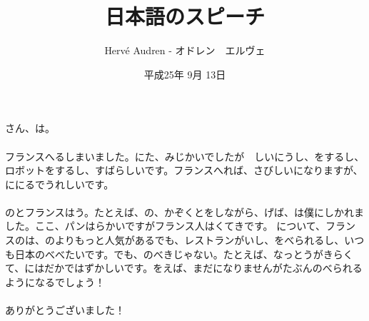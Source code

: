 \documentclass[a4paper,12pt]{article}
\begin{document}
\begin{CJK}{UTF8}{min}

\author{Herv\'e Audren - オドレン　エルヴェ}
\title{日本語のスピーチ}
\date{平成25年 9月 13日}
\maketitle
\paragraph*{}さん、は。
\paragraph*{}フランスへるしまいました。にた、みじかいでしたが　しいにうし、をするし、ロボットをするし、すばらしいです。フランスへれば、さびしいになりますが、ににるでうれしいです。

\paragraph*{}のとフランスはう。たとえば、の、かぞくとをしながら、げば、は僕にしかれました。ここ、パンはらかいですがフランス人はくてきです。
について、フランスのは、のよりもっと人気があるでも、レストランがいし、をべられるし、いつも日本のべべたいです。でも、のべきじゃない。たとえば、なっとうがきらくて、にはだかではずかしいです。をえば、まだになりませんがたぶんのべられるようになるでしょう！

\paragraph*{}ありがとうございました！

\end{CJK}
\end{document}
